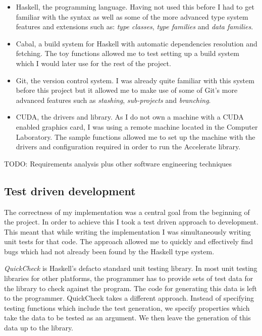 \begin{itemize}
\itemsep1pt\parskip0pt
\item
  Haskell, the programming language. Having not used this before I had
  to get familiar with the syntax as well as some of the more advanced
  type system features and extensions such as: \emph{type classes},
  \emph{type families} and \emph{data families}.
\item
  Cabal, a build system for Haskell with automatic dependencies
  resolution and fetching. The toy functions allowed me to test setting
  up a build system which I would later use for the rest of the project.
\item
  Git, the version control system. I was already quite familiar with
  this system before this project but it allowed me to make use of some
  of Git's more advanced features such as \emph{stashing},
  \emph{sub-projects} and \emph{branching}.
\item
  CUDA, the drivers and library. As I do not own a machine with a CUDA
  enabled graphics card, I was using a remote machine located in the
  Computer Laboratory. The sample functions allowed me to set up the
  machine with the drivers and configuration required in order to run
  the Accelerate library.
\end{itemize}

TODO: Requirements analysis plus other software engineering techniques

\subsection{Test driven development}

The correctness of my implementation was a central goal from the
beginning of the project. In order to achieve this I took a test driven
approach to development. This meant that while writing the
implementation I was simultaneously writing unit tests for that code.
The approach allowed me to quickly and effectively find bugs which had
not already been found by the Haskell type system.

\emph{QuickCheck} is Haskell's defacto standard unit testing library. In
most unit testing libraries for other platforms, the programmer has to
provide sets of test data for the library to check against the program.
The code for generating this data is left to the programmer. QuickCheck
takes a different approach. Instead of specifying testing functions
which include the test generation, we specify properties which take the
data to be tested as an argument. We then leave the generation of this
data up to the library.

